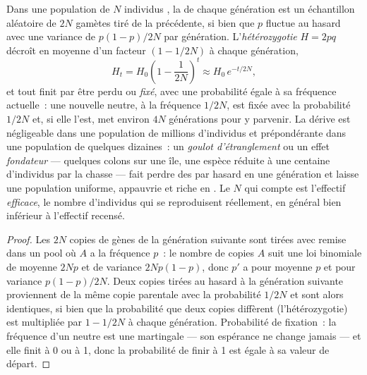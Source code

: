 \begin{theorem}\label{thm:b2:population-genetics:drift}
Dans une population de $N$ individus , la 
de chaque génération est un échantillon aléatoire de $2N$ gamètes tiré
de la précédente, si bien que $p$ fluctue au hasard avec une variance de
$p(1 - p)/2N$ par génération. L'\emph{hétérozygotie} $H = 2pq$
décroît en moyenne d'un facteur $(1 - 1/2N)$ à chaque génération,
\[
H_t = H_0\left(1 - \frac{1}{2N}\right)^{t} \approx H_0\,e^{-t/2N},
\]
et tout  finit par être perdu ou \emph{fixé}, avec une
probabilité égale à sa fréquence actuelle~: une nouvelle  neutre,
à la fréquence $1/2N$, est fixée avec la probabilité $1/2N$ et, si elle
l'est, met environ $4N$ générations pour y parvenir. La dérive est
négligeable dans une population de millions d'individus et prépondérante
dans une population de quelques dizaines~: un
\emph{goulot d'étranglement} ou un effet \emph{fondateur} --- quelques
colons sur une île, une espèce réduite à une centaine d'individus par la
chasse --- fait perdre des  par hasard en une génération et laisse
une population uniforme, appauvrie et riche en . Le $N$ qui
compte est l'effectif \emph{efficace}, le nombre d'individus qui se
reproduisent réellement, en général bien inférieur à l'effectif recensé.
\end{theorem}
\begin{proof}
Les $2N$ copies de gènes de la génération suivante sont tirées avec
remise dans un pool où $A$ a la fréquence $p$~: le nombre de copies $A$
suit une loi binomiale de moyenne $2Np$ et de variance $2Np(1 - p)$, donc $p'$ a
pour moyenne $p$ et pour variance $p(1 - p)/2N$. Deux copies tirées au
hasard à la génération suivante proviennent de la même copie parentale
avec la probabilité $1/2N$ et sont alors identiques, si bien que la
probabilité que deux copies diffèrent (l'hétérozygotie) est multipliée
par $1 - 1/2N$ à chaque génération. Probabilité de fixation~: la
fréquence d'un  neutre est une martingale --- son espérance ne
change jamais --- et elle finit à 0 ou à 1, donc la probabilité de finir
à 1 est égale à sa valeur de départ.
\end{proof}

